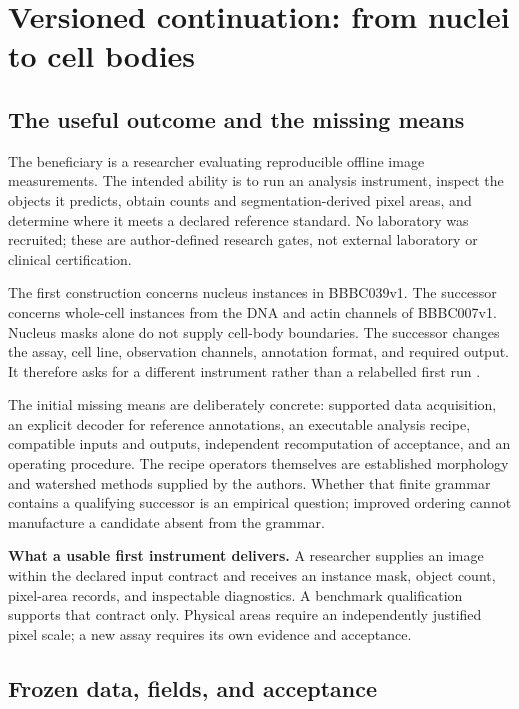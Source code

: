 \section{Versioned continuation: from nuclei to cell bodies}
\label{sec:continuation}

\subsection{The useful outcome and the missing means}

The beneficiary is a researcher evaluating reproducible offline image measurements. The intended ability is to run an analysis instrument, inspect the objects it predicts, obtain counts and segmentation-derived pixel areas, and determine where it meets a declared reference standard. No laboratory was recruited; these are author-defined research gates, not external laboratory or clinical certification.

The first construction concerns nucleus instances in BBBC039v1. The successor concerns whole-cell instances from the DNA and actin channels of BBBC007v1. Nucleus masks alone do not supply cell-body boundaries. The successor changes the assay, cell line, observation channels, annotation format, and required output. It therefore asks for a different instrument rather than a relabelled first run \citep{bbbc039,bbbc007}.

The initial missing means are deliberately concrete: supported data acquisition, an explicit decoder for reference annotations, an executable analysis recipe, compatible inputs and outputs, independent recomputation of acceptance, and an operating procedure. The recipe operators themselves are established morphology and watershed methods supplied by the authors. Whether that finite grammar contains a qualifying successor is an empirical question; improved ordering cannot manufacture a candidate absent from the grammar.

\begin{practicebox}
\textbf{What a usable first instrument delivers.} A researcher supplies an image within the declared input contract and receives an instance mask, object count, pixel-area records, and inspectable diagnostics. A benchmark qualification supports that contract only. Physical areas require an independently justified pixel scale; a new assay requires its own evidence and acceptance.
\end{practicebox}

\subsection{Frozen data, fields, and acceptance}

